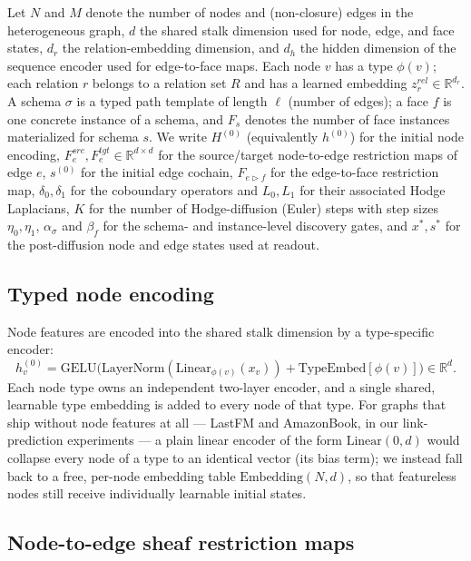 \documentclass{article}
\newcommand{\R}{\mathbb{R}}
\begin{document}
Let $N$ and $M$ denote the number of nodes and (non-closure) edges in the heterogeneous graph, $d$
the shared stalk dimension used for node, edge, and face states, $d_r$ the relation-embedding
dimension, and $d_h$ the hidden dimension of the sequence encoder used for edge-to-face maps. Each
node $v$ has a type $\phi(v)$; each relation $r$ belongs to a relation set $R$ and has a learned
embedding $z^{rel}_r \in \R^{d_r}$. A schema $\sigma$ is a typed path template of length $\ell$
(number of edges); a face $f$ is one concrete instance of a schema, and $F_s$ denotes the number of
face instances materialized for schema $s$. We write $H^{(0)}$ (equivalently $h^{(0)}$) for the
initial node encoding, $F^{src}_e, F^{tgt}_e \in \R^{d\times d}$ for the source/target node-to-edge
restriction maps of edge $e$, $s^{(0)}$ for the initial edge cochain, $F_{e\triangleright f}$ for
the edge-to-face restriction map, $\delta_0,\delta_1$ for the coboundary operators and $L_0, L_1$
for their associated Hodge Laplacians, $K$ for the number of Hodge-diffusion (Euler) steps with
step sizes $\eta_0,\eta_1$, $\alpha_\sigma$ and $\beta_f$ for the schema- and instance-level
discovery gates, and $x^*, s^*$ for the post-diffusion node and edge states used at readout.

\subsection{Typed node encoding}

Node features are encoded into the shared stalk dimension by a type-specific encoder:
\begin{equation}
  h^{(0)}_v = \mathrm{GELU}\big(\mathrm{LayerNorm}(\mathrm{Linear}_{\phi(v)}(x_v)) + \mathrm{TypeEmbed}[\phi(v)]\big) \in \R^d.
  \label{eq:node-enc}
\end{equation}
Each node type owns an independent two-layer encoder, and a single shared, learnable type embedding
is added to every node of that type. For graphs that ship without node features at all --- LastFM
and AmazonBook, in our link-prediction experiments --- a plain linear encoder of the form
$\mathrm{Linear}(0, d)$ would collapse every node of a type to an identical vector (its bias term);
we instead fall back to a free, per-node embedding table $\mathrm{Embedding}(N, d)$, so that
featureless nodes still receive individually learnable initial states.

\subsection{Node-to-edge sheaf restriction maps}
\end{document}
